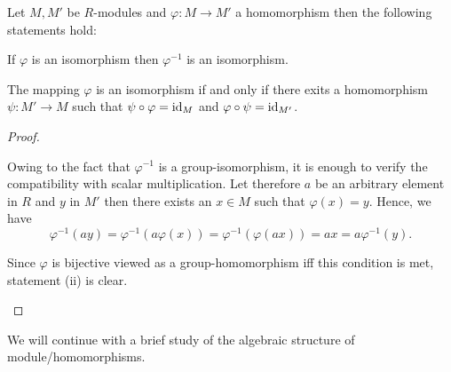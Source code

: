 \begin{lem}
Let $M,M'$ be $R$-modules and $\varphi\colon M\rightarrow M'$ a homomorphism then the following statements hold:
\begin{thmlist}
\item If $\varphi$ is an isomorphism then $\varphi^{-1}$ is an isomorphism.
\item The mapping $\varphi$ is an isomorphism if and only if there exits a homomorphism $\psi\colon M'\rightarrow M$ such that $\psi\circ\varphi=\operatorname{id}_M$ and $\varphi\circ\psi=\operatorname{id}_{M'}$.
\end{thmlist}
\end{lem}
\begin{proof}
\begin{plist}
\item Owing to the fact that $\varphi^{-1}$ is a group-isomorphism, it is enough to verify the compatibility with scalar multiplication. Let therefore $a$ be an arbitrary element in $R$ and $y$ in $M'$ then there exists an $x\in M$ such that $\varphi(x)=y$. Hence, we have
\begin{equation*}
\varphi^{-1}(ay)=\varphi^{-1}(a\varphi(x))=\varphi^{-1}(\varphi(ax))=ax=a\varphi^{-1}(y).
\end{equation*}
\item Since $\varphi$ is bijective viewed as a group-homomorphism iff this condition is met, statement (ii) is clear.
\end{plist}
\end{proof}

We will continue with a brief study of the algebraic structure of module\-/homomorphisms.

